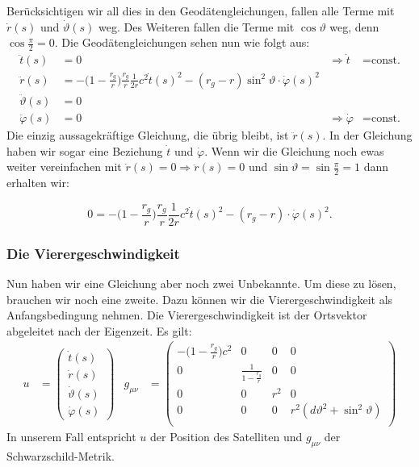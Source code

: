 \begin{refsection}
 Berücksichtigen wir all dies in den Geodätengleichungen, fallen alle Terme mit \( \dot r(s) \) und \( \dot \vartheta (s) \) weg. Des Weiteren fallen die Terme mit \( \cos \vartheta \) weg, denn \( \cos \frac{\pi}{2} = 0 \). Die Geodätengleichungen sehen nun wie folgt aus:
\begin{align*}
\ddot t(s) &= 0 & \Rightarrow \dot t &= \text{const.}\\
\ddot r(s)
&=
-\biggl(1-\frac{r_g}{r}\biggr)\frac{r_g}{r}\frac1{2r}c^2\dot t(s)^2
- (r_g-r)\sin^2 \vartheta \cdot \dot \varphi(s)^2 \\
\ddot \vartheta(s) &= 0 \\
\ddot \varphi(s) &= 0 & \Rightarrow \dot \varphi & = \text{const.}
\end{align*}
Die einzig aussagekräftige Gleichung, die übrig bleibt, ist \( \ddot r(s) \). In der Gleichung haben wir sogar eine Beziehung \( \dot t \) und \( \dot \varphi \). Wenn wir die Gleichung noch ewas weiter vereinfachen mit \( \dot r(s) = 0 \Rightarrow \ddot r(s) = 0 \) und \( \sin \vartheta = \sin \frac{\pi}{2} = 1 \) dann erhalten wir:

\begin{equation}
0 = -\biggl(1-\frac{r_g}{r}\biggr)\frac{r_g}{r}\frac1{2r}c^2\dot t(s)^2 - (r_g-r)\cdot \dot \varphi(s)^2.
\end{equation}

\subsubsection{Die Vierergeschwindigkeit}
Nun haben wir eine Gleichung aber noch zwei Unbekannte. Um diese zu lösen, brauchen wir noch eine zweite. Dazu können wir die Vierergeschwindigkeit als Anfangsbedingung nehmen. Die Vierergeschwindigkeit ist der Ortsvektor abgeleitet nach der Eigenzeit. Es gilt:
\begin{align*}
u &= 
\begin{pmatrix}
\dot t(s) \\
\dot r(s) \\
\dot \vartheta (s) \\
\dot \varphi (s)
\end{pmatrix} &
g_{\mu\nu} &= 
\begin{pmatrix}
-\biggl(1-\frac{r_g}r\biggr)c^2 & 0 & 0 & 0 \\
0 & \frac1{\displaystyle 1-\frac{r_g}r} & 0 & 0 \\
0 & 0 &  r^2 & 0 \\
0 & 0 & 0 &  r^2(d\vartheta^2 + \sin^2\vartheta) \\
\end{pmatrix}
\end{align*}
In unserem Fall entspricht \( u \) der Position des Satelliten und \( g_{\mu\nu} \) der Schwarzschild-Metrik. 


\end{refsection}
